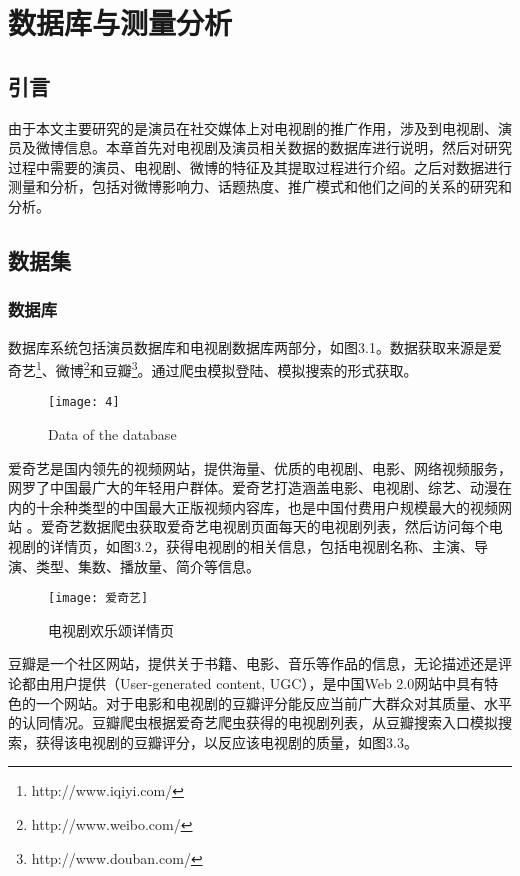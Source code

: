\chapter{数据库与测量分析}
\label{cha:database and measurement}

\section{引言}
由于本文主要研究的是演员在社交媒体上对电视剧的推广作用，涉及到电视剧、演员及微博信息。本章首先对电视剧及演员相关数据的数据库进行说明，然后对研究过程中需要的演员、电视剧、微博的特征及其提取过程进行介绍。之后对数据进行测量和分析，包括对微博影响力、话题热度、推广模式和他们之间的关系的研究和分析。

\section{数据集}
\subsection{数据库}
数据库系统包括演员数据库和电视剧数据库两部分，如图3.1。数据获取来源是爱奇艺\footnote{http://www.iqiyi.com/}、微博\footnote{http://www.weibo.com/}和豆瓣\footnote{http://www.douban.com/}。通过爬虫模拟登陆、模拟搜索的形式获取。

\begin{figure}[H] 
  \centering
  \texttt{[image: 4]}
  \caption{Data of the database}
  \label{4}
\end{figure}

爱奇艺是国内领先的视频网站，提供海量、优质的电视剧、电影、网络视频服务，网罗了中国最广大的年轻用户群体。爱奇艺打造涵盖电影、电视剧、综艺、动漫在内的十余种类型的中国最大正版视频内容库，也是中国付费用户规模最大的视频网站 \cite{http://www.iqiyi.com/common/aboutus.html}。爱奇艺数据爬虫获取爱奇艺电视剧页面每天的电视剧列表，然后访问每个电视剧的详情页，如图3.2，获得电视剧的相关信息，包括电视剧名称、主演、导演、类型、集数、播放量、简介等信息。

\begin{figure}[H] 
  \centering
  \texttt{[image: 爱奇艺]}
  \caption{电视剧欢乐颂详情页}
  \label{爱奇艺}
\end{figure}

豆瓣是一个社区网站，提供关于书籍、电影、音乐等作品的信息，无论描述还是评论都由用户提供（User-generated content, UGC），是中国Web 2.0网站中具有特色的一个网站\cite{https://zh.wikipedia.org/wiki/豆瓣}。对于电影和电视剧的豆瓣评分能反应当前广大群众对其质量、水平的认同情况。豆瓣爬虫根据爱奇艺爬虫获得的电视剧列表，从豆瓣搜索入口模拟搜索，获得该电视剧的豆瓣评分，以反应该电视剧的质量，如图3.3。

